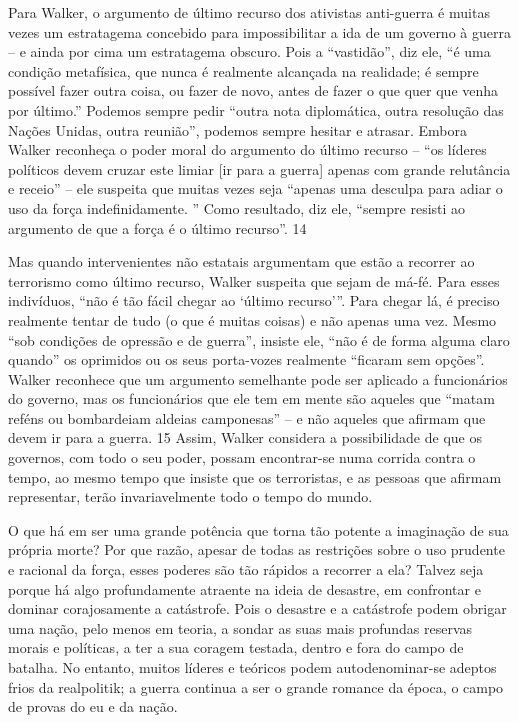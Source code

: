\par
 
Para Walker, o argumento de último recurso dos ativistas anti-guerra é muitas vezes um estratagema concebido para impossibilitar a ida de um governo à guerra – e ainda por cima um estratagema obscuro. Pois a “vastidão”, diz ele, “é uma condição metafísica, que nunca é realmente alcançada na realidade; é sempre possível fazer outra coisa, ou fazer de novo, antes de fazer o que quer que venha por último.” Podemos sempre pedir “outra nota diplomática, outra resolução das Nações Unidas, outra reunião”, podemos sempre hesitar e atrasar. Embora Walker reconheça o poder moral do argumento do último recurso – “os líderes políticos devem cruzar este limiar [ir para a guerra] apenas com grande relutância e receio” – ele suspeita que muitas vezes seja “apenas uma desculpa para adiar o uso da força indefinidamente. ” Como resultado, diz ele, “sempre resisti ao argumento de que a força é o último recurso”.
 {\color{blue} 14}  

 
\par
 
Mas quando intervenientes não estatais argumentam que estão a recorrer ao terrorismo como último recurso, Walker suspeita que sejam de má-fé. Para esses indivíduos, “não é tão fácil chegar ao ‘último recurso’”. Para chegar lá, é preciso realmente tentar de tudo (o que é muitas coisas) e não apenas uma vez. Mesmo “sob condições de opressão e de guerra”, insiste ele, “não é de forma alguma claro quando” os oprimidos ou os seus porta-vozes realmente “ficaram sem opções”. Walker reconhece que um argumento semelhante pode ser aplicado a funcionários do governo, mas os funcionários que ele tem em mente são aqueles que “matam reféns ou bombardeiam aldeias camponesas” – e não aqueles que afirmam que devem ir para a guerra.
 {\color{blue} 15}  
Assim, Walker considera a possibilidade de que os governos, com todo o seu poder, possam encontrar-se numa corrida contra o tempo, ao mesmo tempo que insiste que os terroristas, e as pessoas que afirmam representar, terão invariavelmente todo o tempo do mundo.
 
\par
 
O que há em ser uma grande potência que torna tão potente a imaginação de sua própria morte? Por que razão, apesar de todas as restrições sobre o uso prudente e racional da força, esses poderes são tão rápidos a recorrer a ela? Talvez seja porque há algo profundamente atraente na ideia de desastre, em confrontar e dominar corajosamente a catástrofe. Pois o desastre e a catástrofe podem obrigar uma nação, pelo menos em teoria, a sondar as suas mais profundas reservas morais e políticas, a ter a sua coragem testada, dentro e fora do campo de batalha. No entanto, muitos líderes e teóricos podem autodenominar-se adeptos frios da realpolitik; a guerra continua a ser o grande romance da época, o campo de provas do eu e da nação.
 
